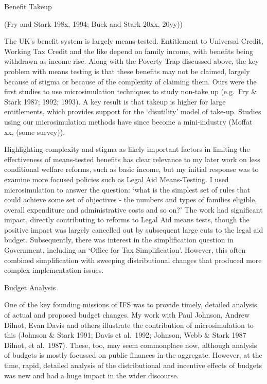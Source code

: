 \documentclass[
  letterpaper,
  DIV=11,
  numbers=noendperiod]{scrartcl}
\begin{document}
Benefit Takeup

(Fry and Stark 198x, 1994; Buck and Stark 20xx, 20yy))

The UK's benefit system is largely means-tested. Entitlement to
Universal Credit, Working Tax Credit and the like depend on family
income, with benefits being withdrawn as income rise. Along with the
Poverty Trap discussed above, the key problem with means testing is that
these benefits may not be claimed, largely because of stigma or because
of the complexity of claiming them. Ours were the first studies to use
microsimulation techniques to study non-take up (e.g.~Fry \& Stark 1987;
1992; 1993). A key result is that takeup is higher for large
entitlements, which provides support for the `disutility' model of
take-up. Studies using our microsimulation methods have since become a
mini-industry (Moffat xx, (some survey)).

Highlighting complexity and stigma as likely important factors in
limiting the effectiveness of means-tested benefits has clear relevance
to my later work on less conditional welfare reforms, such as basic
income, but my initial response was to examine more focused policies
such as Legal Aid Means-Testing. I used microsimulation to answer the
question: `what is the simplest set of rules that could achieve some set
of objectives - the numbers and types of families eligible, overall
expenditure and administrative costs and so on?' The work had
significant impact, directly contributing to reforms to Legal Aid means
tests, though the positive impact was largely cancelled out by
subsequent large cuts to the legal aid budget. Subsequently, there was
interest in the simplification question in Government, including an
`Office for Tax Simplification'. However, this often combined
simplification with sweeping distributional changes that produced more
complex implementation issues.

Budget Analysis

One of the key founding missions of IFS was to provide timely, detailed
analysis of actual and proposed budget changes. My work with Paul
Johnson, Andrew Dilnot, Evan Davis and others illustrate the
contribution of microsimulation to this (Johnson \& Stark 1991; Davis et
al.~1992; Johnson, Webb \& Stark 1987 Dilnot, et al.~1987). These, too,
may seem commonplace now, although analysis of budgets is mostly
focussed on public finances in the aggregate. However, at the time,
rapid, detailed analysis of the distributional and incentive effects of
budgets was new and had a huge impact in the wider discourse.
\end{document}
